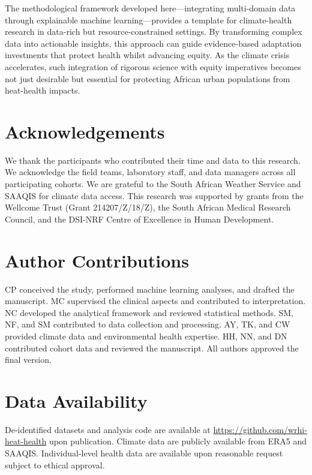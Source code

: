 \documentclass[11pt,a4paper]{article}
\begin{document}
The methodological framework developed here—integrating multi-domain data through explainable machine learning—provides a template for climate-health research in data-rich but resource-constrained settings. By transforming complex data into actionable insights, this approach can guide evidence-based adaptation investments that protect health whilst advancing equity. As the climate crisis accelerates, such integration of rigorous science with equity imperatives becomes not just desirable but essential for protecting African urban populations from heat-health impacts.

\section*{Acknowledgements}

We thank the participants who contributed their time and data to this research. We acknowledge the field teams, laboratory staff, and data managers across all participating cohorts. We are grateful to the South African Weather Service and SAAQIS for climate data access. This research was supported by grants from the Wellcome Trust (Grant 214207/Z/18/Z), the South African Medical Research Council, and the DSI-NRF Centre of Excellence in Human Development.

\section*{Author Contributions}

CP conceived the study, performed machine learning analyses, and drafted the manuscript. MC supervised the clinical aspects and contributed to interpretation. NC developed the analytical framework and reviewed statistical methods. SM, NF, and SM contributed to data collection and processing. AY, TK, and CW provided climate data and environmental health expertise. HH, NN, and DN contributed cohort data and reviewed the manuscript. All authors approved the final version.

\section*{Data Availability}

De-identified datasets and analysis code are available at \url{https://github.com/wrhi-heat-health} upon publication. Climate data are publicly available from ERA5 and SAAQIS. Individual-level health data are available upon reasonable request subject to ethical approval.
\end{document}
